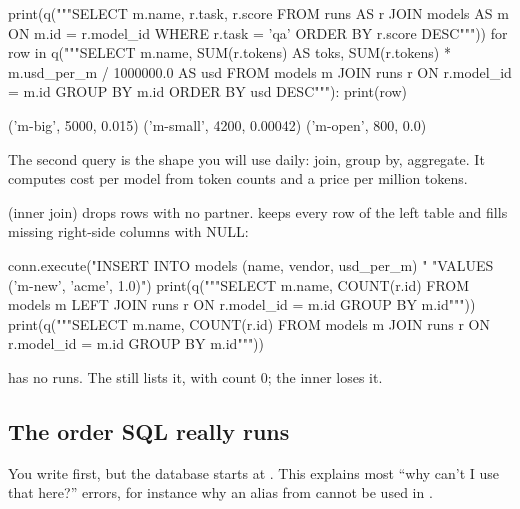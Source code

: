 \begin{pycode}
print(q("""SELECT m.name, r.task, r.score
           FROM runs AS r JOIN models AS m ON m.id = r.model_id
           WHERE r.task = 'qa' ORDER BY r.score DESC"""))
for row in q("""SELECT m.name, SUM(r.tokens) AS toks,
                       SUM(r.tokens) * m.usd_per_m / 1000000.0 AS usd
                FROM models m JOIN runs r ON r.model_id = m.id
                GROUP BY m.id ORDER BY usd DESC"""):
    print(row)
\end{pycode}
\begin{rawcode}
('m-big', 5000, 0.015)
('m-small', 4200, 0.00042)
('m-open', 800, 0.0)
\end{rawcode}

The second query is the shape you will use daily: join, group by, aggregate. It computes
cost per model from token counts and a price per million tokens.

 (inner join) drops rows with no partner.  keeps every row of
the left table and fills missing right-side columns with NULL:

\begin{pycode}
conn.execute("INSERT INTO models (name, vendor, usd_per_m) "
             "VALUES ('m-new', 'acme', 1.0)")
print(q("""SELECT m.name, COUNT(r.id) FROM models m
           LEFT JOIN runs r ON r.model_id = m.id GROUP BY m.id"""))
print(q("""SELECT m.name, COUNT(r.id) FROM models m
           JOIN runs r ON r.model_id = m.id GROUP BY m.id"""))
\end{pycode}
\begin{rawcode}
\end{rawcode}

 has no runs. The  still lists it, with count 0; the inner
 loses it.

\subsection{The order SQL really runs}

You write  first, but the database starts at . This explains most
``why can't I use that here?'' errors, for instance why an alias from  cannot
be used in .

